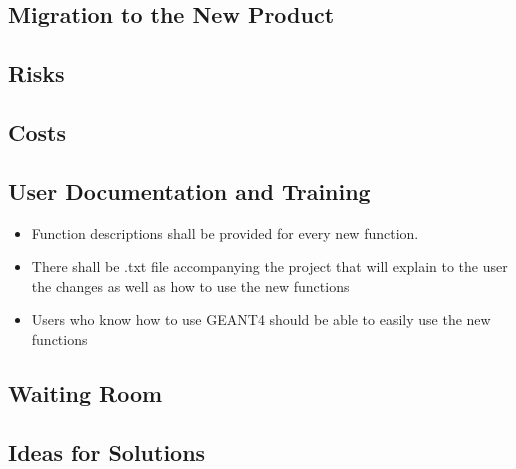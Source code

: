 \documentclass[12pt]{article}
\begin{document}
\subsection{Migration to the New Product} %
\subsection{Risks} %
\subsection{Costs} %
\subsection{User Documentation and Training} %
\begin{itemize}
	\item Function descriptions shall be provided for every new function. 
	\item There shall be .txt file accompanying the project that will explain to the user the changes as well as how to use the new functions
	\item Users who know how to use GEANT4 should be able to easily use the new functions
\end{itemize}
\subsection{Waiting Room} %
\subsection{Ideas for Solutions} %
\end{document}
